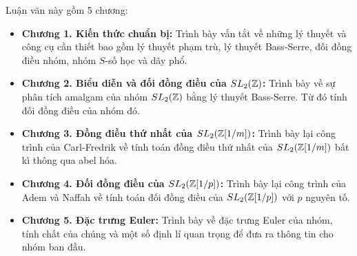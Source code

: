 Luận văn này gồm 5 chương:
\begin{itemize}
    \item \textbf{Chương 1. Kiến thức chuẩn bị:} Trình bày vắn tắt về những lý thuyết và công cụ cần thiết bao gồm lý thuyết phạm trù, lý thuyết Bass-Serre, đối đồng điều nhóm, nhóm $S$-số học và dãy phổ.

    \item \textbf{Chương 2. Biểu diễn và đối đồng điều của $SL_2(\mathbb Z)$:} Trình bày về sự phân tích amalgam của nhóm $SL_2(\mathbb Z)$ bằng lý thuyết Bass-Serre. Từ đó tính đối đồng điều của nhóm đó.

    \item \textbf{Chương 3. Đồng điều thứ nhất của $SL_2(\mathbb Z[1/m])$:} Trình bày lại công trình của Carl-Fredrik về tính toán đồng điều thứ nhất của $SL_2(\mathbb Z[1/m])$ bất kì thông qua abel hóa.

    \item \textbf{Chương 4. Đối đồng điều của $SL_2(\mathbb Z[1/p])$:} Trình bày lại công trình của Adem và Naffah về tính toán đối đồng điều của $SL_2(\mathbb Z[1/p])$ với $p$ nguyên tố.

    \item \textbf{Chương 5. Đặc trưng Euler:} Trình bày về đặc trưng Euler của nhóm, tính chất của chúng và một số định lí quan trọng để đưa ra thông tin cho nhóm ban đầu.
\end{itemize}